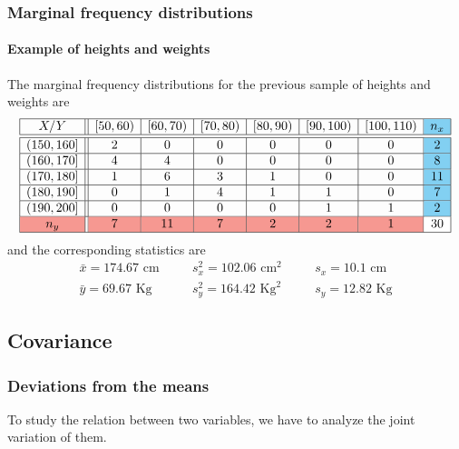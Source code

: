 \begin{frame}
\frametitle{Marginal frequency distributions}
\framesubtitle{Example of heights and weights}
The marginal frequency distributions for the previous sample of heights and weights are
\[
\begin{array}{|c||c|c|c|c|c|c|>{\columncolor{color1!50}}c|}
\hline
  X/Y & [50,60) & [60,70) & [70,80) & [80,90) & [90,100) & [100,110) & n_x\\
  \hline\hline
  (150,160] & 2 & 0 & 0 & 0 & 0 & 0 & 2\\
  \hline
  (160,170] & 4 & 4 & 0 & 0 & 0 & 0 & 8\\
  \hline
  (170,180] & 1 & 6 & 3 & 1 & 0 & 0 & 11 \\
  \hline
  (180,190] & 0 & 1 & 4 & 1 & 1 & 0 & 7 \\
  \hline
  (190,200] & 0 & 0 & 0 & 0 & 1 & 1 & 2\\
  \hline
  \rowcolor{color2!50}
  n_y & 7 & 11 & 7 & 2 & 2 & 1 & \cellcolor{white} 30\\
  \hline
\end{array}
\]
and the corresponding statistics are
\[
\begin{array}{lllll}
\bar x = 174.67 \mbox{ cm} & \quad & s^2_x = 102.06 \mbox{ cm}^2 & \quad & s_x = 10.1 \mbox{ cm}\\
\bar y = 69.67 \mbox{ Kg} & & s^2_y = 164.42 \mbox{ Kg}^2 & & s_y = 12.82 \mbox{ Kg}
\end{array}
\]
\end{frame}


\subsection{Covariance}
\begin{frame}
\frametitle{Deviations from the means}
To study the relation between two variables, we have to analyze the joint variation of them.
\begin{center}
\end{center}
\end{frame}


